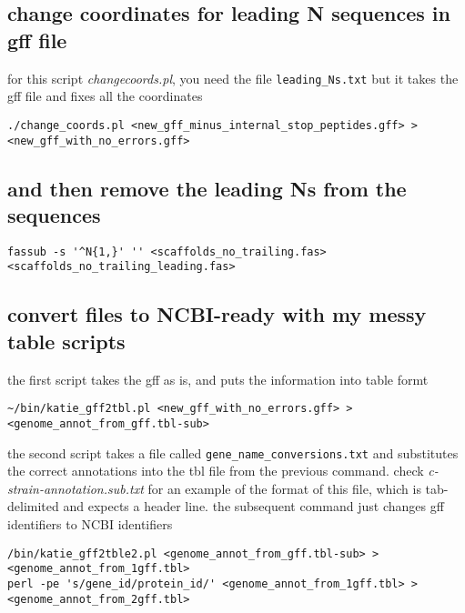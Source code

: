 \documentclass[11pt]{article}
\begin{document}
\subsection*{change coordinates for leading N sequences in gff file}
\label{sec-3.3}

for this script \emph{changecoords.pl}, you need the file \texttt{leading\_Ns.txt}
but it takes the gff file and fixes all the coordinates

\begin{verbatim}
./change_coords.pl <new_gff_minus_internal_stop_peptides.gff> > <new_gff_with_no_errors.gff>
\end{verbatim}


\subsection*{and then remove the leading Ns from the sequences}
\label{sec-3.4}


\begin{verbatim}
fassub -s '^N{1,}' '' <scaffolds_no_trailing.fas> <scaffolds_no_trailing_leading.fas>
\end{verbatim}



\subsection*{convert files to NCBI-ready with my messy table scripts}
\label{sec-3.5}


the first script takes the gff as is, and puts the information into table formt

\begin{verbatim}
~/bin/katie_gff2tbl.pl <new_gff_with_no_errors.gff> > <genome_annot_from_gff.tbl-sub>
\end{verbatim}


the second script takes a file called \texttt{gene\_name\_conversions.txt} and substitutes the correct annotations into the tbl file from the previous command.
check \emph{c-strain-annotation.sub.txt} for an example of the format of this file, which is tab-delimited and expects a header line.
the subsequent command just changes gff identifiers to NCBI identifiers

\begin{verbatim}
/bin/katie_gff2tble2.pl <genome_annot_from_gff.tbl-sub> > <genome_annot_from_1gff.tbl>
perl -pe 's/gene_id/protein_id/' <genome_annot_from_1gff.tbl> > <genome_annot_from_2gff.tbl>
\end{verbatim}
\end{document}
